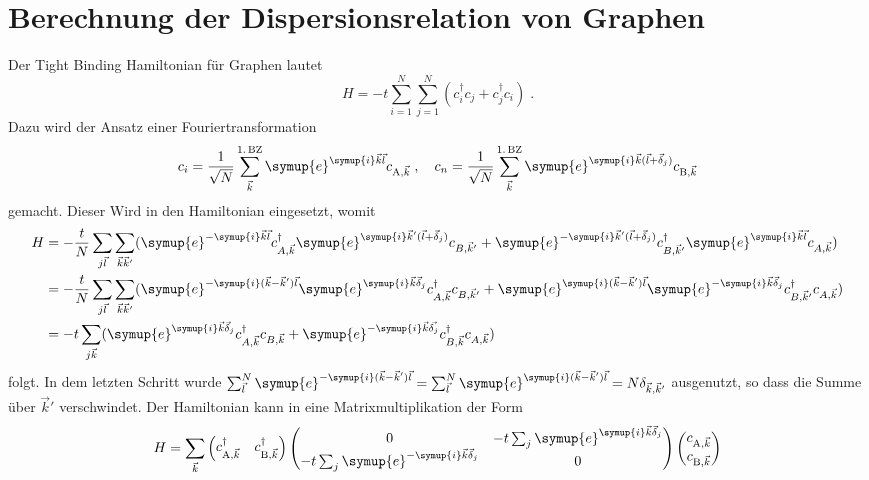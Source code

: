 \section{Berechnung der Dispersionsrelation von Graphen}
\label{sec:calc_dispersion}
Der Tight Binding Hamiltonian für Graphen lautet
\begin{equation*}
   H= - t \sum_{i=1}^N \sum_{j=1}^N\left ( c_i^\dagger c_j + c_j^\dagger c_i \right ) \; .
\end{equation*}
Dazu wird der Ansatz einer Fouriertransformation 
\begin{equation*}
    c_i = \frac{1}{\sqrt{N}} \sum_{\vec{k}}^{1. \, \text{BZ}} \symup{e}^{\symup{i}\vec{k}\vec{l}} c_{\text{A}, \vec{k}} \; , 
    \quad c_n = \frac{1}{\sqrt{N}} \sum_{\vec{k}}^{1. \, \text{BZ}} \symup{e}^{\symup{i}\vec{k}(\vec{l}+\vec{\delta}_j)} c_{\text{B}, \vec{k}}
\end{equation*}
gemacht. 
Dieser Wird in den Hamiltonian eingesetzt, womit 
\begin{align*}
    H &= -\frac{t}{N} \sum_{j\vec{l}} \sum_{\vec{k}\vec{k}'} ( \symup{e}^{-\symup{i}\vec{k}\vec{l}}c^\dagger_{A,\vec{k}} 
    \symup{e}^{\symup{i}\vec{k}'(\vec{l}+\vec{\delta}_j)}c_{B,\vec{k}'} + \symup{e}^{-\symup{i}\vec{k}'(\vec{l}+\vec{\delta}_j)} c^\dagger_{B,\vec{k}'} 
    \symup{e}^{\symup{i}\vec{k}\vec{l}}c_{A,\vec{k}}) \\
    &= -\frac{t}{N} \sum_{j\vec{l}} \sum_{\vec{k}\vec{k}'} ( \symup{e}^{-\symup{i}(\vec{k}- \vec{k}')\vec{l}}\symup{e}^{\symup{i}\vec{k}\vec{\delta}_j}c^\dagger_{A,\vec{k}} c_{B,\vec{k}'} + 
    \symup{e}^{\symup{i}(\vec{k}- \vec{k}')\vec{l}} \symup{e}^{-\symup{i}\vec{k}\vec{\delta}_j} c^\dagger_{B,\vec{k}'}c_{A,\vec{k}}) \\
    &= -t \sum_{j\vec{k}} ( \symup{e}^{\symup{i}\vec{k}\vec{\delta}_j}c^\dagger_{A,\vec{k}} c_{B,\vec{k}} + 
    \symup{e}^{-\symup{i}\vec{k}\vec{\delta_j}} c^\dagger_{B,\vec{k}}c_{A,\vec{k}})
\end{align*}
folgt.
In dem letzten Schritt wurde $\sum_{\vec{l}}^N \symup{e}^{-\symup{i}(\vec{k}- \vec{k}')\vec{l}} 
= \sum_{\vec{l}}^N \symup{e}^{\symup{i}(\vec{k}- \vec{k}')\vec{l}} = N\delta_{\vec{k}, \vec{k}'}$ ausgenutzt, so dass die Summe über $\vec{k}'$ verschwindet.
Der Hamiltonian kann in eine Matrixmultiplikation der Form 
\begin{equation*}
    H = \sum_{\vec{k}} \begin{pmatrix}
        c_{\text{A},\vec{k}}^{\dagger} & c_{\text{B},\vec{k}}^{\dagger}
    \end{pmatrix}
    \begin{pmatrix}
        0 & -t\sum_{j} \symup{e}^{\symup{i}\vec{k}\vec{\delta}_j}     \\
        -t\sum_{j} \symup{e}^{-\symup{i}\vec{k}\vec{\delta}_j} & 0     
    \end{pmatrix}
    \begin{pmatrix}
        c_{\text{A},\vec{k}} \\
        c_{\text{B},\vec{k}}
    \end{pmatrix}
\end{equation*}
